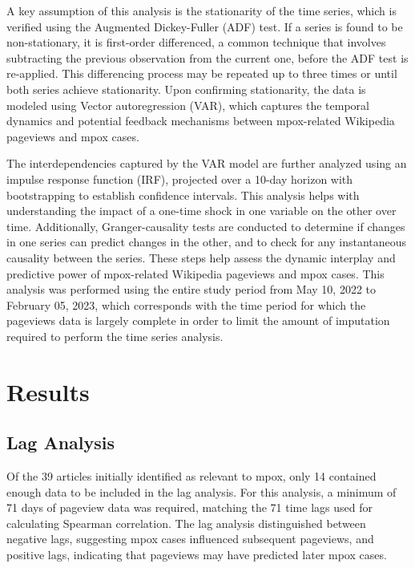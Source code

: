 \documentclass[
  12pt,
]{article}
\begin{document}
A key assumption of this analysis is the stationarity of the time
series, which is verified using the Augmented Dickey-Fuller (ADF) test.
If a series is found to be non-stationary, it is first-order
differenced, a common technique that involves subtracting the previous
observation from the current one, before the ADF test is re-applied.
This differencing process may be repeated up to three times or until
both series achieve stationarity. Upon confirming stationarity, the data
is modeled using Vector autoregression (VAR), which captures the
temporal dynamics and potential feedback mechanisms between mpox-related
Wikipedia pageviews and mpox cases.

The interdependencies captured by the VAR model are further analyzed
using an impulse response function (IRF), projected over a 10-day
horizon with bootstrapping to establish confidence intervals. This
analysis helps with understanding the impact of a one-time shock in one
variable on the other over time. Additionally, Granger-causality tests
are conducted to determine if changes in one series can predict changes
in the other, and to check for any instantaneous causality between the
series. These steps help assess the dynamic interplay and predictive
power of mpox-related Wikipedia pageviews and mpox cases. This analysis
was performed using the entire study period from May 10, 2022 to
February 05, 2023, which corresponds with the time period for which the
pageviews data is largely complete in order to limit the amount of
imputation required to perform the time series analysis.

\section{Results}\label{results}

\subsection{Lag Analysis}\label{lag-analysis-1}

Of the 39 articles initially identified as relevant to mpox, only 14
contained enough data to be included in the lag analysis. For this
analysis, a minimum of 71 days of pageview data was required, matching
the 71 time lags used for calculating Spearman correlation. The lag
analysis distinguished between negative lags, suggesting mpox cases
influenced subsequent pageviews, and positive lags, indicating that
pageviews may have predicted later mpox cases.
\end{document}
